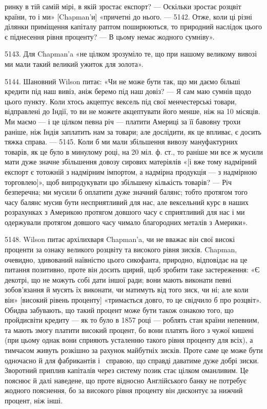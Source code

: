 \parcont{}  %
ринку в тій самій мірі, в якій зростає експорт? — Оскільки зростає розцвіт
країни, то і ми» [Chapman’и] «причетні до нього. — 5142. Отже, коли ці різні
ділянки приміщення капіталу раптом поширюються, то природний наслідок цього
є піднесення рівня проценту? — В цьому немає жодного сумніву».

5143. Для Chapman’a «не цілком зрозуміло те, що при нашому великому
вивозі ми мали такий великий ужиток для золота».

5144. Шановний Wilson питає: «Чи не може бути так, що ми даємо більші
кредити під наш вивіз, аніж беремо під наш довіз? — Я сам маю сумнів щодо цього
пункту. Коли хтось акцептує вексель під свої менчестерські товари, відправлені
до Індії, то ви не можете акцептувати його менше, ніж на 10 місяців.
Ми маємо — і це цілком певна річ — платити Америці за її бавовну трохи раніше,
ніж Індія заплатить нам за товари; але дослідити, як це впливає, є досить
тяжка справа. — 5145. Коли б ми мали збільшення вивозу мануфактурних
товарів, як це було в минулому році, на 20 міл. ф. ст., то раніше ми все ж
мусили мати дуже значне збільшення довозу сирових матеріялів «[і вже тому надмірний
експорт є тотожній з надмірним імпортом, а надмірна продукція — з надмірною
торговлею]», щоб випродукувати цю збільшену кількість товарів? — Річ
безперечна; ми мусили б оплатити дуже значний балянс; тобто протягом того
часу балянс мусив бути несприятливий для нас, але вексельний курс в наших
розрахунках з Америкою протягом довшого часу є сприятливий для нас і ми
одержували протягом довшого часу чимало благородних металів з Америки».

5148. Wilson питає архілихваря Chapman’a, чи не вважає він свої високі
проценти за ознаку великого розцвіту та високого рівня зисків. Chapman, очевидно,
здивований наївністю цього сикофанта, природно, відповідає на це питання
позитивно, проте він досить щирий, щоб зробити таке застереження: «Є декотрі,
що не можуть собі дати іншої ради; вони мають виконати певні зобов'язання
й мусять їх виконати, чи матимуть від того зиск, чи ні; але коли він»
[високий рівень проценту] «тримається довго, то це свідчило б про розцвіт». Обидва
забувають, що такий процент може бути також ознакою того, що пройдисвіти
кредиту — як то було в 1857 році — роблять стан країни непевним, та мають змогу
платити високий процент, бо вони платять його з чужої кишені (при цьому однак
вони сприяють усталенню такого рівня проценту для всіх), а тимчасом живуть
розкішно за рахунок майбутніх зисків. Проте саме це може бути одночасно й для
фабрикантів і~ справою, що справді даватиме дуже добрі зиски. Зворотний
приплив капіталів через систему позик стає цілком оманливим. Це пояснює й
далі наведене, що проте відносно Англійського банку не потребує жодного пояснення,
бо за високого рівня проценту він дисконтує за нижчий процент, ніж інші.

